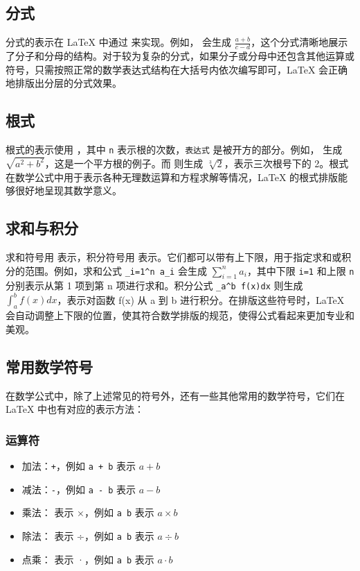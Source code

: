 \documentclass{article}
\begin{document}
\subsection{分式}
分式的表示在 LaTeX 中通过 \texttt{} 来实现。例如，\texttt{} 会生成 \(\frac{a+b}{c-d}\)，这个分式清晰地展示了分子和分母的结构。对于较为复杂的分式，如果分子或分母中还包含其他运算或符号，只需按照正常的数学表达式结构在大括号内依次编写即可，LaTeX 会正确地排版出分层的分式效果。

\subsection{根式}
根式的表示使用 \texttt{}，其中 \texttt{n} 表示根的次数，\texttt{表达式} 是被开方的部分。例如，\texttt{} 生成 \(\sqrt{a^2 + b^2}\)，这是一个平方根的例子。而 \texttt{} 则生成 \(\sqrt[3]{2}\)，表示三次根号下的 2。根式在数学公式中用于表示各种无理数运算和方程求解等情况，LaTeX 的根式排版能够很好地呈现其数学意义。

\subsection{求和与积分}
求和符号用 \texttt{\sum} 表示，积分符号用 \texttt{\int} 表示。它们都可以带有上下限，用于指定求和或积分的范围。例如，求和公式 \texttt{\sum\_{i=1}^n a\_i} 会生成 \(\sum_{i=1}^n a_i\)，其中下限 \texttt{i=1} 和上限 \texttt{n} 分别表示从第 1 项到第 n 项进行求和。积分公式 \texttt{\int\_a^b f(x)dx} 则生成 \(\int_a^b f(x)dx\)，表示对函数 f(x) 从 a 到 b 进行积分。在排版这些符号时，LaTeX 会自动调整上下限的位置，使其符合数学排版的规范，使得公式看起来更加专业和美观。

\subsection{常用数学符号}
在数学公式中，除了上述常见的符号外，还有一些其他常用的数学符号，它们在 LaTeX 中也有对应的表示方法：

\subsubsection{运算符}
\begin{itemize}
    \item 加法：\texttt{+}，例如 \texttt{a + b} 表示 \(a + b\)
    \item 减法：\texttt{-}，例如 \texttt{a - b} 表示 \(a - b\)
    \item 乘法：\texttt{\times} 表示 ×，例如 \texttt{a \times b} 表示 \(a \times b\)
    \item 除法：\texttt{\div} 表示 ÷，例如 \texttt{a \div b} 表示 \(a \div b\)
    \item 点乘：\texttt{\cdot} 表示 ·，例如 \texttt{a \cdot b} 表示 \(a \cdot b\)
\end{itemize}
\end{document}
